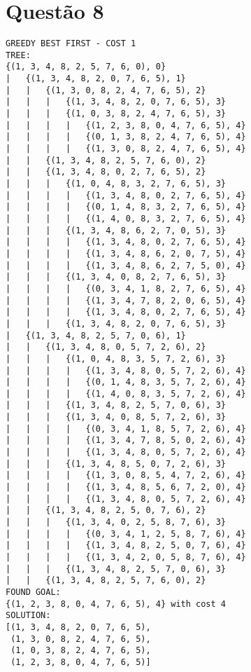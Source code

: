 \documentclass{article}
\begin{document}
\newpage

\section{Questão 8}

\begin{verbatim}
GREEDY BEST FIRST - COST 1
TREE:
{(1, 3, 4, 8, 2, 5, 7, 6, 0), 0}
|   {(1, 3, 4, 8, 2, 0, 7, 6, 5), 1}
|   |   {(1, 3, 0, 8, 2, 4, 7, 6, 5), 2}
|   |   |   {(1, 3, 4, 8, 2, 0, 7, 6, 5), 3}
|   |   |   {(1, 0, 3, 8, 2, 4, 7, 6, 5), 3}
|   |   |   |   {(1, 2, 3, 8, 0, 4, 7, 6, 5), 4}
|   |   |   |   {(0, 1, 3, 8, 2, 4, 7, 6, 5), 4}
|   |   |   |   {(1, 3, 0, 8, 2, 4, 7, 6, 5), 4}
|   |   {(1, 3, 4, 8, 2, 5, 7, 6, 0), 2}
|   |   {(1, 3, 4, 8, 0, 2, 7, 6, 5), 2}
|   |   |   {(1, 0, 4, 8, 3, 2, 7, 6, 5), 3}
|   |   |   |   {(1, 3, 4, 8, 0, 2, 7, 6, 5), 4}
|   |   |   |   {(0, 1, 4, 8, 3, 2, 7, 6, 5), 4}
|   |   |   |   {(1, 4, 0, 8, 3, 2, 7, 6, 5), 4}
|   |   |   {(1, 3, 4, 8, 6, 2, 7, 0, 5), 3}
|   |   |   |   {(1, 3, 4, 8, 0, 2, 7, 6, 5), 4}
|   |   |   |   {(1, 3, 4, 8, 6, 2, 0, 7, 5), 4}
|   |   |   |   {(1, 3, 4, 8, 6, 2, 7, 5, 0), 4}
|   |   |   {(1, 3, 4, 0, 8, 2, 7, 6, 5), 3}
|   |   |   |   {(0, 3, 4, 1, 8, 2, 7, 6, 5), 4}
|   |   |   |   {(1, 3, 4, 7, 8, 2, 0, 6, 5), 4}
|   |   |   |   {(1, 3, 4, 8, 0, 2, 7, 6, 5), 4}
|   |   |   {(1, 3, 4, 8, 2, 0, 7, 6, 5), 3}
|   {(1, 3, 4, 8, 2, 5, 7, 0, 6), 1}
|   |   {(1, 3, 4, 8, 0, 5, 7, 2, 6), 2}
|   |   |   {(1, 0, 4, 8, 3, 5, 7, 2, 6), 3}
|   |   |   |   {(1, 3, 4, 8, 0, 5, 7, 2, 6), 4}
|   |   |   |   {(0, 1, 4, 8, 3, 5, 7, 2, 6), 4}
|   |   |   |   {(1, 4, 0, 8, 3, 5, 7, 2, 6), 4}
|   |   |   {(1, 3, 4, 8, 2, 5, 7, 0, 6), 3}
|   |   |   {(1, 3, 4, 0, 8, 5, 7, 2, 6), 3}
|   |   |   |   {(0, 3, 4, 1, 8, 5, 7, 2, 6), 4}
|   |   |   |   {(1, 3, 4, 7, 8, 5, 0, 2, 6), 4}
|   |   |   |   {(1, 3, 4, 8, 0, 5, 7, 2, 6), 4}
|   |   |   {(1, 3, 4, 8, 5, 0, 7, 2, 6), 3}
|   |   |   |   {(1, 3, 0, 8, 5, 4, 7, 2, 6), 4}
|   |   |   |   {(1, 3, 4, 8, 5, 6, 7, 2, 0), 4}
|   |   |   |   {(1, 3, 4, 8, 0, 5, 7, 2, 6), 4}
|   |   {(1, 3, 4, 8, 2, 5, 0, 7, 6), 2}
|   |   |   {(1, 3, 4, 0, 2, 5, 8, 7, 6), 3}
|   |   |   |   {(0, 3, 4, 1, 2, 5, 8, 7, 6), 4}
|   |   |   |   {(1, 3, 4, 8, 2, 5, 0, 7, 6), 4}
|   |   |   |   {(1, 3, 4, 2, 0, 5, 8, 7, 6), 4}
|   |   |   {(1, 3, 4, 8, 2, 5, 7, 0, 6), 3}
|   |   {(1, 3, 4, 8, 2, 5, 7, 6, 0), 2}
FOUND GOAL:
{(1, 2, 3, 8, 0, 4, 7, 6, 5), 4} with cost 4
SOLUTION:
[(1, 3, 4, 8, 2, 0, 7, 6, 5),
 (1, 3, 0, 8, 2, 4, 7, 6, 5),
 (1, 0, 3, 8, 2, 4, 7, 6, 5),
 (1, 2, 3, 8, 0, 4, 7, 6, 5)]

\end{verbatim}
\end{document}
